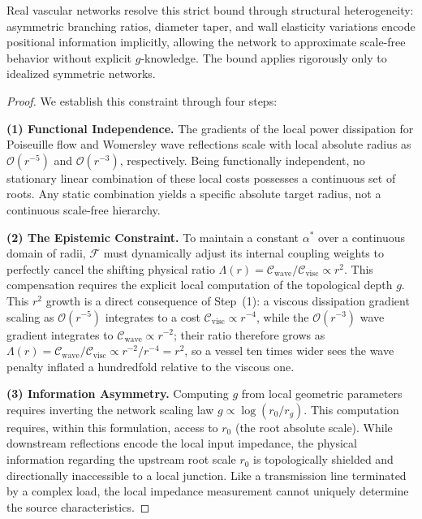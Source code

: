 \begin{remark}
Real vascular networks resolve this strict bound through structural
heterogeneity: asymmetric branching ratios, diameter taper, and wall elasticity
variations encode positional information implicitly, allowing the network to
approximate scale-free behavior without explicit $g$-knowledge. The bound
applies rigorously only to idealized symmetric networks.
\end{remark}

\begin{proof}
We establish this constraint through four steps:

\textbf{(1) Functional Independence.} The gradients of the local power
dissipation for Poiseuille flow and Womersley wave reflections scale with local
absolute radius as $\mathcal{O}(r^{-5})$ and $\mathcal{O}(r^{-3})$,
respectively. Being functionally independent, no stationary linear combination
of these local costs possesses a continuous set of roots. Any static combination
yields a specific absolute target radius, not a continuous scale-free hierarchy.

\textbf{(2) The Epistemic Constraint.} To maintain a constant $\alpha^*$ over a
continuous domain of radii, $\mathcal{F}$ must dynamically adjust its internal
coupling weights to perfectly cancel the shifting physical ratio $\Lambda(r) =
\mathcal{C}_{\mathrm{wave}}/\mathcal{C}_{\mathrm{visc}} \propto r^2$. This
compensation requires the explicit local computation of the topological depth
$g$. This $r^{2}$ growth is a direct consequence of Step~(1): a viscous
dissipation gradient scaling as $\mathcal{O}(r^{-5})$ integrates to a cost
$\mathcal{C}_{\mathrm{visc}}\propto r^{-4}$, while the $\mathcal{O}(r^{-3})$
wave gradient integrates to $\mathcal{C}_{\mathrm{wave}}\propto r^{-2}$; their
ratio therefore grows as $\Lambda(r) =
\mathcal{C}_{\mathrm{wave}}/\mathcal{C}_{\mathrm{visc}} \propto r^{-2}/r^{-4} =
r^{2}$, so a vessel ten times wider sees the wave penalty inflated a hundredfold
relative to the viscous one.

\textbf{(3) Information Asymmetry.} Computing $g$ from local geometric
parameters requires inverting the network scaling law $g \propto \log(r_0/r_g)$.
This computation requires, within this formulation, access to $r_0$ (the
root absolute scale). While downstream reflections encode the local input
impedance, the physical information regarding the upstream root scale $r_0$ is
topologically shielded and directionally inaccessible to a local junction. Like
a transmission line terminated by a complex load, the local impedance
measurement cannot uniquely determine the source characteristics.


\end{proof}
